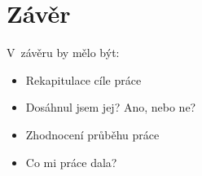 \chapter*{Závěr}
V~závěru by mělo být:
\begin{itemize}
    \item Rekapitulace cíle práce
    \item Dosáhnul jsem jej? Ano, nebo ne?
    \item Zhodnocení průběhu práce
    \item Co mi práce dala?
\end{itemize}

\newpage